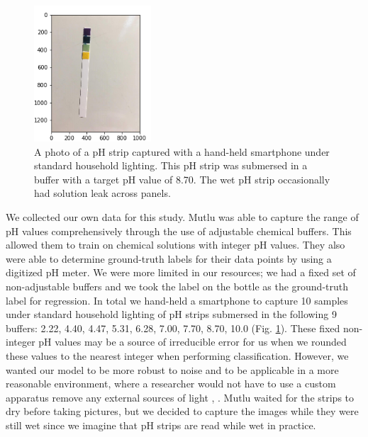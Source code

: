 \documentclass[journal]{IEEEtran}
\begin{document}
\begin{figure}
\centering
\includegraphics[height=2in]{raw8p70_07.png}
\caption{A photo of a pH strip captured with a hand-held smartphone under standard household lighting. This pH strip was submersed in a buffer with a target pH value of 8.70. The wet pH strip occasionally had solution leak across panels.}
\label{raw_photo}
\end{figure}

We collected our own data for this study. Mutlu was able to capture the range of pH values comprehensively through the use of adjustable chemical buffers. This allowed them to train on chemical solutions with integer pH values. They also were able to determine ground-truth labels for their data points by using a digitized pH meter. We were more limited in our resources; we had a fixed set of non-adjustable buffers and we took the label on the bottle as the ground-truth label for regression. In total we hand-held a smartphone to capture 10 samples under standard household lighting of pH strips submersed in the following 9 buffers: 2.22, 4.40, 4.47, 5.31, 6.28, 7.00, 7.70, 8.70, 10.0 (Fig. \ref{raw_photo}). These fixed non-integer pH values may be a source of irreducible error for us when we rounded these values to the nearest integer when performing classification. However, we wanted our model to be more robust to noise and to be applicable in a more reasonable environment, where a researcher would not have to use a custom apparatus remove any external sources of light \cite{mutlu}, \cite{kim}. Mutlu waited for the strips to dry before taking pictures, but we decided to capture the images while they were still wet since we imagine that pH strips are read while wet in practice.
\end{document}
